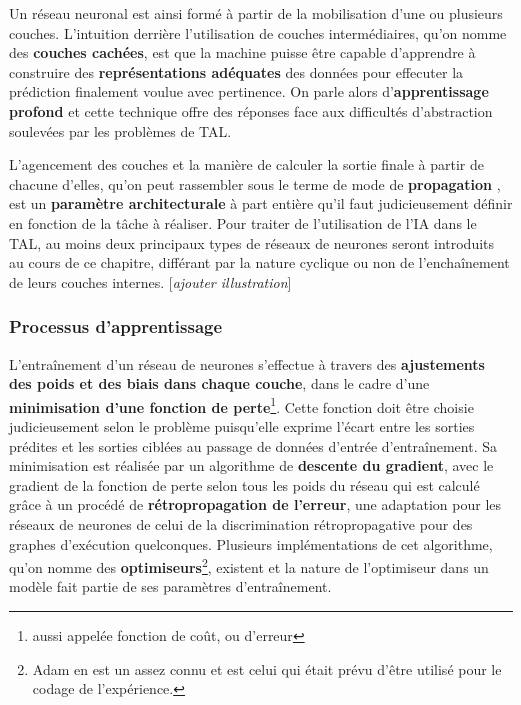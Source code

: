 \documentclass[12pt, french, twoside]{report}
\begin{document}
Un réseau neuronal est ainsi formé à partir de la mobilisation d'une ou plusieurs couches. L'intuition derrière l'utilisation de couches intermédiaires, qu'on nomme des \textbf{couches cachées}, est que la machine puisse être capable d'apprendre à construire des \textbf{représentations adéquates} des données pour effecuter la prédiction finalement voulue avec pertinence. On parle alors d'\textbf{apprentissage profond} et cette technique offre des réponses face aux difficultés d'abstraction soulevées par les problèmes de TAL.

L'agencement des couches et la manière de calculer la sortie finale à partir de chacune d'elles, qu'on peut rassembler sous le terme de \og mode de \textbf{propagation} \fg, est un \textbf{paramètre architecturale} à part entière qu'il faut judicieusement définir en fonction de la tâche à réaliser. Pour traiter de l'utilisation de l'IA dans le TAL, au moins deux principaux types de réseaux de neurones seront introduits au cours de ce chapitre, différant par la nature cyclique ou non de l'enchaînement de leurs couches internes.\cite[introduction + section 3]{jurafsky_ffnn} [\textit{ajouter illustration}]

\subsubsection{Processus d'apprentissage}
L'entraînement d'un réseau de neurones s'effectue à travers des \textbf{ajustements des poids et des biais dans chaque couche}, dans le cadre d'une \textbf{minimisation d'une fonction de perte}\footnote{aussi appelée fonction de coût, ou d'erreur}. Cette fonction doit être choisie judicieusement selon le problème puisqu'elle exprime l'écart entre les sorties prédites et les sorties ciblées au passage de données d'entrée d'entraînement. Sa minimisation est réalisée par un algorithme de \textbf{descente du gradient}, avec le gradient de la fonction de perte selon tous les poids du réseau qui est calculé grâce à un procédé de \textbf{rétropropagation de l'erreur}, une adaptation pour les réseaux de neurones de celui de la discrimination rétropropagative pour des graphes d'exécution quelconques. Plusieurs implémentations de cet algorithme, qu'on nomme des \textbf{optimiseurs}\footnote{Adam\cite{kingma2017adam} en est un assez connu et est celui qui était prévu d'être utilisé pour le codage de l'expérience.}, existent et la nature de l'optimiseur dans un modèle fait partie de ses paramètres d'entraînement.
\end{document}
